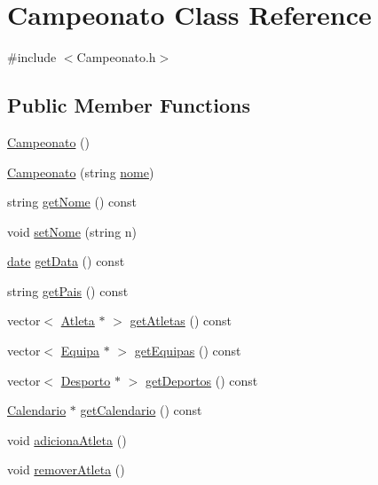 \hypertarget{class_campeonato}{}\section{Campeonato Class Reference}
\label{class_campeonato}


{\ttfamily \#include $<$Campeonato.\+h$>$}

\subsection*{Public Member Functions}
\begin{DoxyCompactItemize}
\item 
\hyperlink{class_campeonato_aa14214a5863681b19922ad1515a3d14b}{Campeonato} ()
\item 
\hyperlink{class_campeonato_a6cdd161a2ea5ffd62810e8bfd4a4dc6c}{Campeonato} (string \hyperlink{class_campeonato_a670b0857b7a8bc3c5dbf0f927ee192fe}{nome})
\item 
string \hyperlink{class_campeonato_ae014ca753715e808b6d67c73f241f27d}{get\+Nome} () const 
\item 
void \hyperlink{class_campeonato_ab2654ae701c2418dab5c70aa4cd74b57}{set\+Nome} (string n)
\item 
\hyperlink{structdate}{date} \hyperlink{class_campeonato_ab78957e0803c30d318455d3d2b4f843b}{get\+Data} () const 
\item 
string \hyperlink{class_campeonato_a152f1d8474275af981214ed24663bf3f}{get\+Pais} () const 
\item 
vector$<$ \hyperlink{class_atleta}{Atleta} $\ast$ $>$ \hyperlink{class_campeonato_ab37dc7253ffed81cc81e90c569d83cf9}{get\+Atletas} () const 
\item 
vector$<$ \hyperlink{class_equipa}{Equipa} $\ast$ $>$ \hyperlink{class_campeonato_ac82ee7c13b116b71525cff9f557b45c2}{get\+Equipas} () const 
\item 
vector$<$ \hyperlink{class_desporto}{Desporto} $\ast$ $>$ \hyperlink{class_campeonato_aa07da18865320276e7ea4506cc81d8fe}{get\+Deportos} () const 
\item 
\hyperlink{class_calendario}{Calendario} $\ast$ \hyperlink{class_campeonato_afb142b85e3413714cb1eecfc3e474f5c}{get\+Calendario} () const 
\item 
void \hyperlink{class_campeonato_a7d63444db444c0d0de2a78db7fbcc20d}{adiciona\+Atleta} ()
\item 
void \hyperlink{class_campeonato_aa81be7f36c3daf7dc1f4d97f4274e953}{remover\+Atleta} ()
\item 

\end{DoxyCompactItemize}
